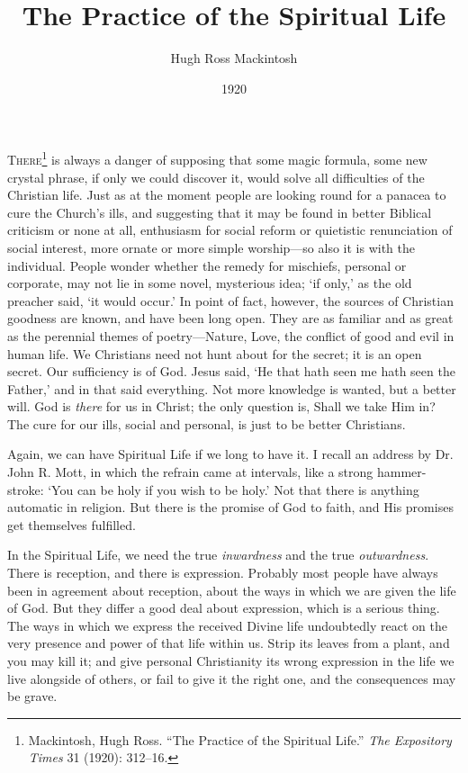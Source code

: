 \documentclass[12pt,a5paper]{article}
\title{The Practice of the Spiritual Life}
\author{Hugh Ross Mackintosh}
\date{1920}
\begin{document}
\maketitle

\textsc{There}\footnote{Mackintosh, Hugh Ross. ``The Practice of the Spiritual Life.'' \textit{The Expository Times} 31 (1920): 312--16.} 
is always a danger of supposing that some magic formula, some new crystal phrase, if only we could discover it, would solve all difficulties of the Christian life. Just as at the moment people are looking round for a panacea to cure the Church's ills, and suggesting that it may be found in better Biblical criticism or none at all, enthusiasm for social reform or quietistic renunciation of social interest, more ornate or more simple worship---so also it is with the individual. People wonder whether the remedy for mischiefs, personal or corporate, may not lie in some novel, mysterious idea; `if only,' as the old preacher said, `it would occur.' In point of fact, however, the sources of Christian goodness are known, and have been long open. They are as familiar and as great as the perennial themes of poetry---Nature, Love, the conflict of good and evil in human life. We Christians need not hunt about for the secret; it is an open secret. Our sufficiency is of God. Jesus said, `He that hath seen me hath seen the Father,' and in that said everything. Not more knowledge is wanted, but a better will. God is \textit{there} for us in Christ; the only question is, Shall we take Him in? The cure for our ills, social and personal, is just to be better Christians.

Again, we can have Spiritual Life if we long to have it. I recall an address by Dr. John R. Mott, in which the refrain came at intervals, like a strong hammer-stroke: `You can be holy if you wish to be holy.' Not that there is anything automatic in religion. But there is the promise of God to faith, and His promises get themselves fulfilled. 

In the Spiritual Life, we need the true \textit{inwardness} and the true \textit{outwardness}. There is reception, and there is expression. Probably most people have always been in agreement about reception, about the ways in which we are given the life of
God. But they differ a good deal about expression, which is a serious thing. The ways in which we express the received Divine life undoubtedly react on the very presence and power of that life within us. Strip its leaves from a plant, and you may kill it; and give personal Christianity its wrong expression in the life we live alongside of others, or fail to give it the right one, and the consequences may be grave.
\end{document}
